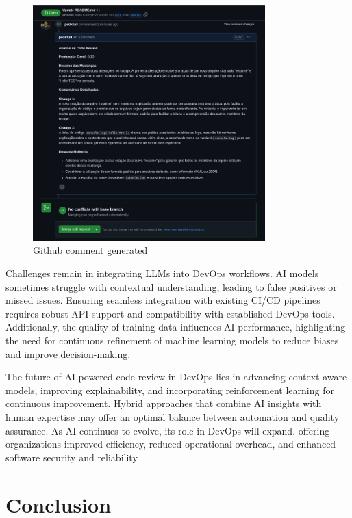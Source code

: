 \documentclass[12pt]{article}
\begin{document}
\begin{figure}[ht]
    \centering
    \includegraphics[width=0.8\textwidth]{github.png}
    \caption{Github comment generated}
    \label{fig:github}
\end{figure}

Challenges remain in integrating LLMs into DevOps workflows. AI models sometimes struggle with contextual understanding, leading to false positives or missed issues. Ensuring seamless integration with existing CI/CD pipelines requires robust API support and compatibility with established DevOps tools. Additionally, the quality of training data influences AI performance, highlighting the need for continuous refinement of machine learning models to reduce biases and improve decision-making. \cite{integratingAIDevops}
    
The future of AI-powered code review in DevOps lies in advancing context-aware models, improving explainability, and incorporating reinforcement learning for continuous improvement. Hybrid approaches that combine AI insights with human expertise may offer an optimal balance between automation and quality assurance. As AI continues to evolve, its role in DevOps will expand, offering organizations improved efficiency, reduced operational overhead, and enhanced software security and reliability. \cite{intelligentDevops}

\section{Conclusion}
\end{document}
